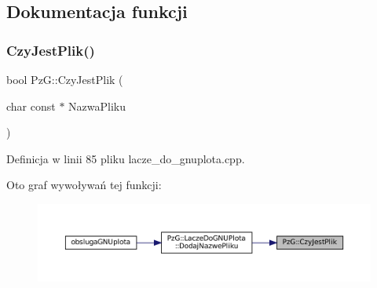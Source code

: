 \subsection{Dokumentacja funkcji}
\mbox{\label{namespace_pz_g_ae1ae4d36f66c77879380ba73da8e20e3}} 
\subsubsection{\texorpdfstring{CzyJestPlik()}{CzyJestPlik()}}
{\footnotesize\ttfamily bool Pz\+G\+::\+Czy\+Jest\+Plik (\begin{DoxyParamCaption}\item[{char const $\ast$}]{Nazwa\+Pliku }\end{DoxyParamCaption})}



Definicja w linii 85 pliku lacze\+\_\+do\+\_\+gnuplota.\+cpp.

Oto graf wywoływań tej funkcji\+:\nopagebreak
\begin{figure}[H]
\begin{center}
\leavevmode
\includegraphics[width=350pt]{namespace_pz_g_ae1ae4d36f66c77879380ba73da8e20e3_icgraph}
\end{center}
\end{figure}
